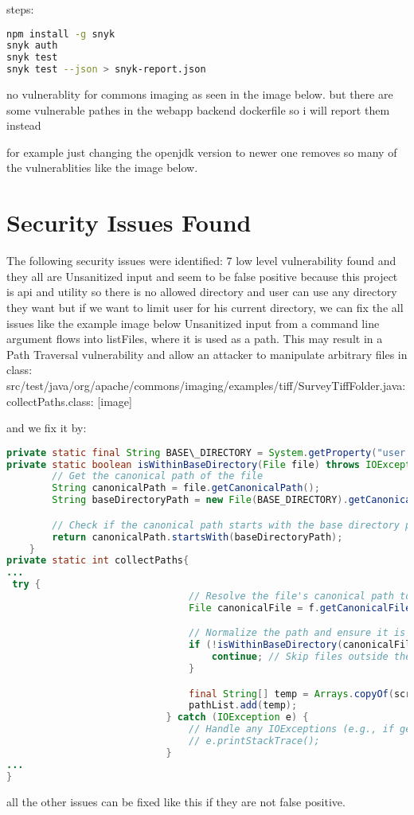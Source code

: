 \documentclass[a4paper,12pt]{report}
\begin{document}
steps:
\begin{lstlisting}[language=bash]
npm install -g snyk
snyk auth
snyk test
snyk test --json > snyk-report.json
\end{lstlisting}
no vulnerablity for commons imaging as seen in the image below. but there are some vulnerable pathes in the webapp backend dockerfile so i will report them instead


for example just changing the openjdk version to newer one removes so many of the vulnerablities like the image below.

\section{Security Issues Found}
The following security issues were identified: 7 low level vulnerability found and they all are Unsanitized input and seem to be false positive because this project is api and utility so there is no allowed directory and user can use any directory they want but if we want to limit user for his current directory, we can fix the all issues like the example image below Unsanitized input from a command line argument flows into listFiles, where it is used as a path. This may result in a Path Traversal vulnerability and allow an attacker to manipulate arbitrary files in class: src/test/java/org/apache/commons/imaging/examples/tiff/SurveyTiffFolder.java:collectPaths.class:
[image]

and we fix it by:

\begin{lstlisting}[language=java, caption=SurveyTiffFolder.java:collectPath.class fix]
private static final String BASE\_DIRECTORY = System.getProperty("user.dir");
private static boolean isWithinBaseDirectory(File file) throws IOException {
        // Get the canonical path of the file
        String canonicalPath = file.getCanonicalPath();
        String baseDirectoryPath = new File(BASE_DIRECTORY).getCanonicalPath();

        // Check if the canonical path starts with the base directory path
        return canonicalPath.startsWith(baseDirectoryPath);
    }
private static int collectPaths{
...
 try {
                                // Resolve the file's canonical path to get the absolute path
                                File canonicalFile = f.getCanonicalFile();

                                // Normalize the path and ensure it is within the base directory
                                if (!isWithinBaseDirectory(canonicalFile)) {
                                    continue; // Skip files outside the base directory
                                }

                                final String[] temp = Arrays.copyOf(scratch, depth + 1);
                                pathList.add(temp);
                            } catch (IOException e) {
                                // Handle any IOExceptions (e.g., if getCanonicalPath fails)
                                // e.printStackTrace();
                            }
...
}
\end{lstlisting}
all the other issues can be fixed like this if they are not false positive.
\end{document}

